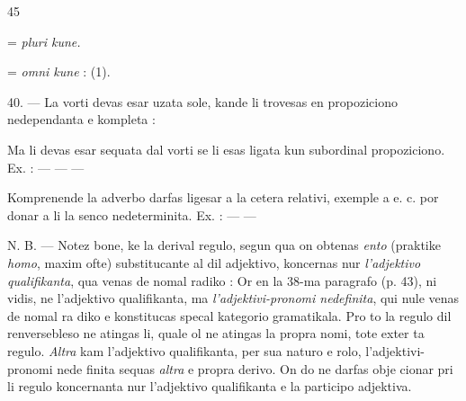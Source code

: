 \begin{VUpage}[49]{45}

 = \textit{pluri kune.}

\VUblancAlinea
{} = \textit{omni kune} : \nl
{} (1).

\VUblanc{6.06pt}%
40. --- La vorti  devas esar\nl
uzata sole, kande li trovesas en propoziciono nedependanta\nl
e kompleta : \nl
{}

\VUblancAlinea
Ma li devas esar sequata dal vorti \nl
{} se li esas ligata kun subordinal propoziciono. Ex. :\nl
{}\nl
{} --- \cc
{} ---  ---\nl
{}

\VUblancAlinea
Komprenende la adverbo  darfas ligesar a la cetera\nl
relativi, exemple a  e. c. por donar a li\nl
la senco nedeterminita. Ex. : \nl
{} --- \nl
{} --- \nl
{}

\VUblancAlinea
N. B. --- Notez bone, ke la derival regulo, segun qua on\nl
obtenas \textit{ento} (praktike \textit{homo}, maxim ofte) substitucante \nl
al  dil adjektivo, koncernas nur \textit{l'adjektivo qualifikanta},\nl
qua venas de nomal radiko :  Or en la 38-ma\nl
paragrafo (p. 43), ni vidis, ne l'adjektivo qualifikanta, ma\nl
\textit{l'adjektivi-pronomi nedefinita}, qui nule venas de nomal ra\cc
diko e konstitucas specal kategorio gramatikala. Pro to la\nl
regulo dil renversebleso ne atingas li, quale ol ne atingas\nl
la propra nomi, tote exter ta regulo. \textit{Altra} kam l'adjektivo\nl
qualifikanta, per sua naturo e rolo, l'adjektivi-pronomi nede\cc
finita sequas \textit{altra} e propra derivo. On do ne darfas obje\cc
cionar pri li regulo koncernanta nur l'adjektivo qualifikanta\nl
e la participo adjektiva.


\end{VUpage}
